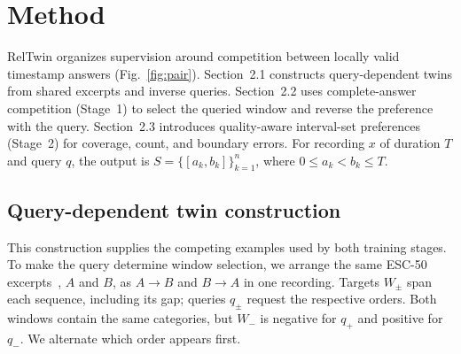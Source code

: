 \section{Method}
\label{sec:method}
RelTwin organizes supervision around competition between locally valid timestamp answers (Fig.~\ref{fig:pair}). Section~2.1 constructs query-dependent twins from shared excerpts and inverse queries. Section~2.2 uses complete-answer competition (Stage~1) to select the queried window and reverse the preference with the query. Section~2.3 introduces quality-aware interval-set preferences (Stage~2) for coverage, count, and boundary errors. For recording $x$ of duration $T$ and query $q$, the output is $S=\{[a_k,b_k]\}_{k=1}^{n}$, where $0\leq a_k<b_k\leq T$.

\subsection{Query-dependent twin construction}
This construction supplies the competing examples used by both training stages. To make the query determine window selection, we arrange the same ESC-50 excerpts~\cite{piczak2015esc}, $A$ and $B$, as $A\!\rightarrow\!B$ and $B\!\rightarrow\!A$ in one recording. Targets $W_\pm$ span each sequence, including its gap; queries $q_\pm$ request the respective orders. Both windows contain the same categories, but $W_-$ is negative for $q_+$ and positive for $q_-$. We alternate which order appears first.

